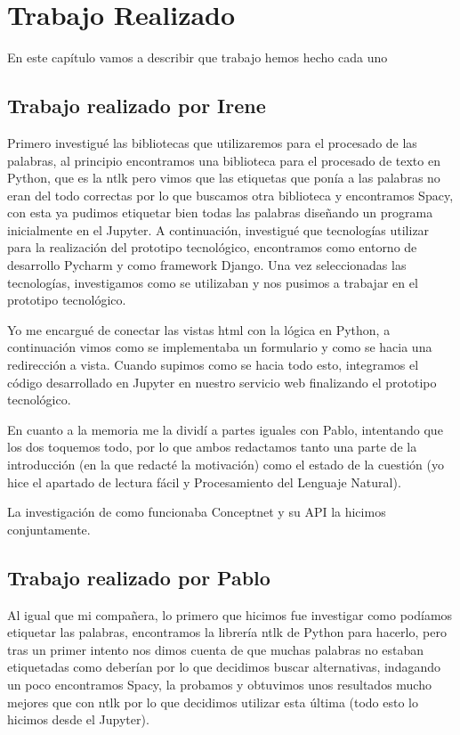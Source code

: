 \chapter{Trabajo Realizado}
\label{cap:TrabajoRealizado}


En este capítulo vamos a describir que trabajo hemos hecho cada uno


\section{Trabajo realizado por Irene}
\label{cap:sec:trabajo_Irene}

Primero investigué las bibliotecas que utilizaremos para el procesado de las palabras, al principio encontramos una biblioteca para el procesado de texto en Python, que es la ntlk pero vimos que las etiquetas que ponía a las palabras no eran del todo correctas por lo que buscamos otra biblioteca y encontramos Spacy, con esta ya pudimos etiquetar bien todas las palabras diseñando un programa inicialmente en el Jupyter. A continuación, investigué que tecnologías utilizar para la realización del prototipo tecnológico, encontramos como entorno de desarrollo Pycharm y como framework Django. Una vez seleccionadas las tecnologías, investigamos como se utilizaban y nos pusimos a trabajar en el prototipo tecnológico.

Yo me encargué de conectar las vistas html con la lógica en Python, a continuación vimos como se implementaba un formulario y como se hacia una redirección a vista. Cuando supimos como se hacia todo esto, integramos el código desarrollado en Jupyter en nuestro servicio web finalizando el prototipo tecnológico. \newline

En cuanto a la memoria me la dividí a partes iguales con Pablo, intentando que los dos toquemos todo, por lo que ambos redactamos tanto una parte de la introducción (en la que redacté la motivación) como el estado de la cuestión (yo hice el apartado de lectura fácil y Procesamiento del Lenguaje Natural). \newline

La investigación de como funcionaba Conceptnet y su API la hicimos conjuntamente.


\section{Trabajo realizado por Pablo}
\label{cap:sec:trabajo_Pablo}

Al igual que mi compañera, lo primero que hicimos fue investigar como podíamos etiquetar las palabras, encontramos la librería ntlk de Python para hacerlo, pero tras un primer intento nos dimos cuenta de que muchas palabras no estaban etiquetadas como deberían por lo que decidimos buscar alternativas, indagando un poco encontramos Spacy, la probamos y obtuvimos unos resultados mucho mejores que con ntlk por lo que decidimos utilizar esta última (todo esto lo hicimos desde el Jupyter). 


